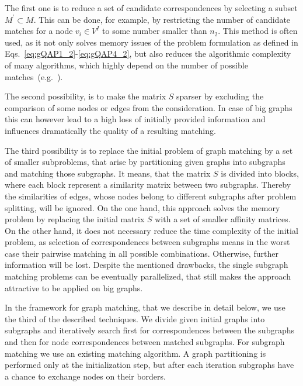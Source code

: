 The first one is to reduce a set of candidate correspondences by selecting a subset $M^\prime\subset M$. This can be done, for example, by restricting the number of candidate matches for a node $v_i\in V^I$ to some number smaller than $n_2$. This method is often used, as it not only solves memory issues of the problem formulation as defined in Eqs.~\eqref{eq:gQAP1_2}-\eqref{eq:gQAP4_2}, but also reduces the algorithmic complexity of many algorithms, which highly depend on the number of possible matches~(e.g.~\cite{Cho2010_RRWM,Cho2012_ProgressiveGM,Cho2014_Haystack,Leordeanu2005_SM}).

The second possibility, is to make the matrix $S$ sparser by excluding the comparison of some nodes or edges from the consideration. In case of big graphs this can however lead to a high loss of initially provided information and influences dramatically the quality of a resulting matching. 

The third possibility is to replace the initial problem of graph matching by a set of smaller subproblems, that arise by partitioning given graphs into subgraphs and matching those subgraphs. It means, that the matrix $S$ is divided into blocks, where each block represent a similarity matrix between two subgraphs. Thereby the similarities of edges, whose nodes belong to different subgraphs after problem splitting, will be ignored. On the one hand, this approach solves the memory problem by replacing the initial matrix $S$ with a set of smaller affinity matrices. On the other hand, it does not necessary reduce the time complexity of the initial problem, as selection of correspondences between subgraphs means in the worst case their pairwise matching in all possible combinations. Otherwise, further information will be lost. Despite the mentioned drawbacks, the single subgraph matching problems can be eventually parallelized, that still makes the approach attractive to be applied on big graphs.

In the framework for graph matching, that we describe in detail below, we use the third of the described techniques. We divide given initial graphs into subgraphs and iteratively search first for correspondences between the subgraphs and then for node correspondences between matched subgraphs. For subgraph matching we use an existing matching algorithm. A graph partitioning is performed only at the initialization step, but after each iteration subgraphs have a chance to exchange nodes on their borders.

